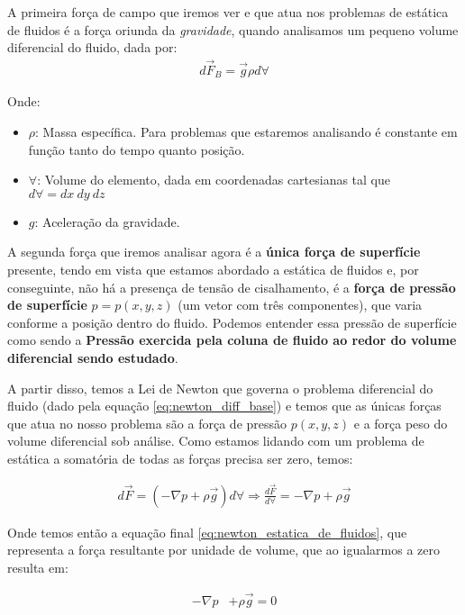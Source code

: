 \documentclass{article}
\begin{document}
A primeira força de campo que iremos ver e que atua nos problemas de estática de fluidos é a força oriunda da \emph{gravidade}, quando analisamos um pequeno volume diferencial do fluido, dada por:
\begin{align}
    d\vec{F}_B = \vec{g}\rho d \forall \label{eq:forca_peso}
\end{align}

Onde:
\begin{itemize}
    \item $\rho$: Massa específica. Para problemas que estaremos analisando é constante em função tanto do tempo quanto posição.
    \item $\forall$: Volume do elemento, dada em coordenadas cartesianas tal que $d\forall = dx \ dy \ dz$
    \item $g$: Aceleração da gravidade.
\end{itemize}

A segunda força que iremos analisar agora é a \textbf{única força de superfície} presente, tendo em vista que estamos abordado a estática de fluidos e, por conseguinte, não há a presença
de tensão de cisalhamento, é a \textbf{força de pressão de superfície} $p = p(x, y, z)$ (um vetor com três componentes), que varia conforme a posição dentro do fluido. Podemos entender essa pressão de superfície como sendo a
\textbf{Pressão exercida pela coluna de fluido ao redor do volume diferencial sendo estudado}.

A partir disso, temos a Lei de Newton que governa o problema diferencial do fluido (dado pela equação \ref{eq:newton_diff_base}) e temos que as únicas forças que atua no nosso problema são a
força de pressão $p(x, y, z)$ e a força peso do volume diferencial sob análise. Como estamos lidando com um problema de estática a somatória de todas as forças precisa ser zero, temos:

\begin{align}
    d\vec{F} = (-\nabla p + \rho \vec{g}) d\forall \Rightarrow \frac{d\vec{F}}{d\forall} = -\nabla p + \rho \vec g \label{eq:newton_estatica_de_fluidos}
\end{align}

Onde temos então a equação final \ref{eq:newton_estatica_de_fluidos}, que representa a força resultante por unidade de volume, que ao igualarmos a zero resulta em:

\begin{align}
    -\nabla p & + \rho \vec g = 0\label{eq:newton_resultante_estatica_de_fluidos}
\end{align}
\end{document}
